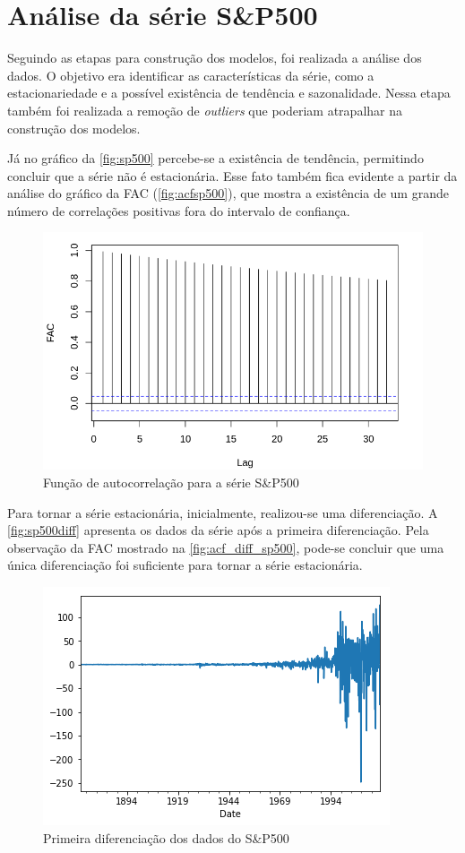 \documentclass[
    12pt,
    oneside,
    a4paper,
    english,
    brazil
]{abntex2}
\begin{document}
\section{Análise da série S\&P500}

Seguindo as  etapas para construção  dos modelos,  foi realizada a  análise dos
dados.  O  objetivo  era  identificar  as  características  da  série,  como  a
estacionariedade e  a possível  existência de  tendência e  sazonalidade. Nessa
etapa  também  foi  realizada  a  remoção  de  \textit{outliers}  que  poderiam
atrapalhar na construção dos modelos.

Já  no gráfico  da \autoref{fig:sp500}  percebe-se a  existência de  tendência,
permitindo  concluir que  a série  não é  estacionária. Esse  fato também  fica
evidente a  partir da análise  do gráfico da FAC  (\autoref{fig:acfsp500}), que
mostra  a existência  de  um grande  número de  correlações  positivas fora  do
intervalo de confiança.

\begin{figure}[ht]
    \centering
    \caption{Função de autocorrelação para a série S\&P500}\label{fig:acfsp500}
    \includegraphics[width=.5\linewidth]{images/SP500_FAC.png}
\end{figure}

Para tornar a série  estacionária, inicialmente, realizou-se uma diferenciação.
A  \autoref{fig:sp500diff}  apresenta  os  dados   da  série  após  a  primeira
diferenciação. Pela observação da FAC mostrado na \autoref{fig:acf_diff_sp500},
pode-se concluir que uma única diferenciação foi suficiente para tornar a série
estacionária.

\begin{figure}[ht]
    \centering
    \caption{Primeira diferenciação dos dados do S\&P500}\label{fig:sp500diff}
    \includegraphics[width=.5\linewidth]{images/sp500diff.png}
\end{figure}
\end{document}
